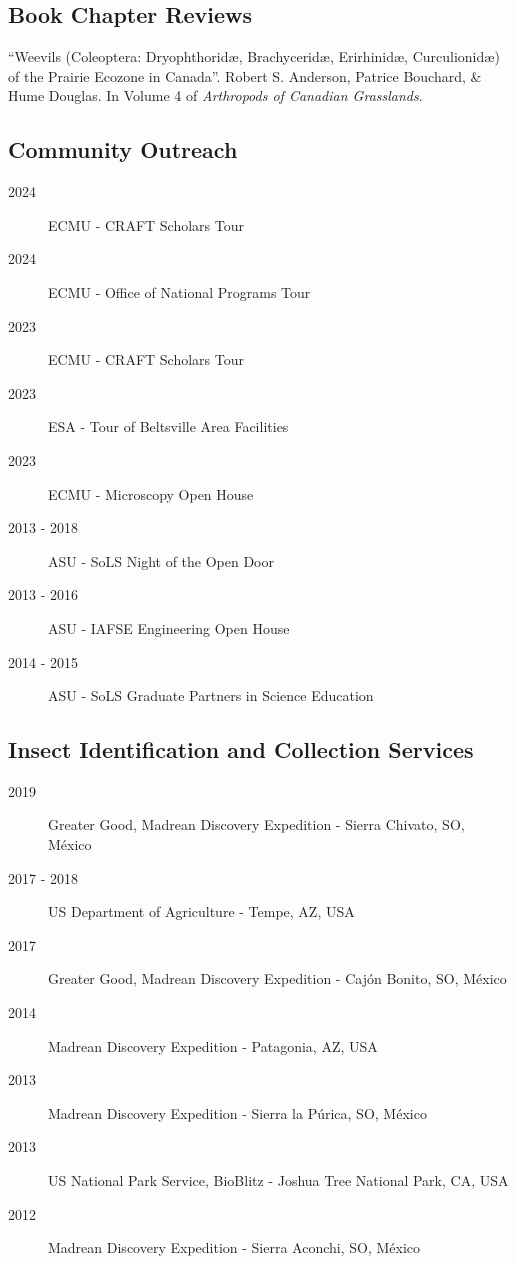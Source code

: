 \documentclass[12pt,a4paper]{article}
\begin{document}
	\subsection*{Book Chapter Reviews}
		\begin{description}
			\item ``Weevils (Coleoptera: Dryophthorid\ae, Brachycerid\ae, Erirhinid\ae, Curculionid\ae) of the Prairie Ecozone in Canada''.
					Robert S. Anderson, Patrice Bouchard, \& Hume Douglas.
					In Volume 4 of \textit{Arthropods of Canadian Grasslands}.
		\end{description}

	\subsection*{Community Outreach}
		\begin{description}
			\item [2024] ECMU - CRAFT Scholars Tour
			\item [2024] ECMU - Office of National Programs Tour
			\item [2023] ECMU - CRAFT Scholars Tour
			\item [2023] ESA - Tour of Beltsville Area Facilities
			\item [2023] ECMU - Microscopy Open House
			\item [2013 - 2018] ASU - SoLS Night of the Open Door
			\item [2013 - 2016] ASU - IAFSE Engineering Open House
			\item [2014 - 2015] ASU - SoLS Graduate Partners in Science Education
		\end{description}
		
	\subsection*{Insect Identification and Collection Services}
		\begin{description}
			\item [2019] Greater Good, Madrean Discovery Expedition - Sierra Chivato, SO, M\'{e}xico
			\item [2017 - 2018] US Department of Agriculture - Tempe, AZ, USA
			\item [2017] Greater Good, Madrean Discovery Expedition - Caj\'{o}n Bonito, SO, M\'{e}xico
			\item [2014] Madrean Discovery Expedition - Patagonia, AZ, USA
			\item [2013] Madrean Discovery Expedition - Sierra la P\'{u}rica, SO, M\'{e}xico
			\item [2013] US National Park Service, BioBlitz - Joshua Tree National Park, CA, USA
			\item [2012] Madrean Discovery Expedition - Sierra Aconchi, SO, M\'{e}xico
		\end{description}
\end{document}
